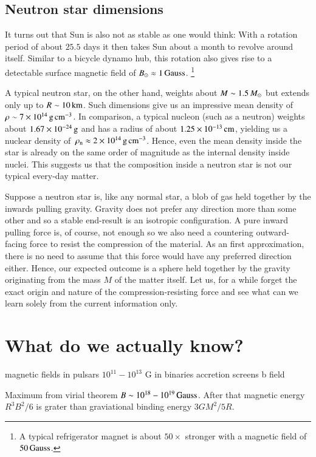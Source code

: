 \subsection{Neutron star dimensions}
It turns out that Sun is also not as stable as one would think:
With a rotation period of about $25.5$ days it then takes Sun about a month to revolve around itself.
Similar to a bicycle dynamo hub, this rotation also gives rise to a detectable surface magnetic field of $B_{\odot} \approx 1 \, \mathrm{Gauss}$.%
\footnote{A typical refrigerator magnet is about $50\times$ stronger with a magnetic field of $50\, \mathrm{Gauss}$.}

A typical neutron star, on the other hand, weights about $M \sim 1.5\, M_{\odot}$ but extends only up to $R \sim 10\, \mathrm{km}$.
Such dimensions give us an impressive mean density of $\rho \sim 7 \times 10^{14} \, \mathrm{g}\,\mathrm{cm}^{-3} $.
In comparison, a typical nucleon (such as a neutron) weights about $1.67 \times 10^{-24} \, \mathrm{g}$ and has a radius of about $1.25 \times 10^{-13} \, \mathrm{cm}$, yielding us a nuclear density of $\, \rho_{\mathrm{n}}  \approx 2 \times 10^{14} \, \mathrm{g}\,\mathrm{cm}^{-3} $.
Hence, even the mean density inside the star is already on the same order of magnitude as the internal density inside nuclei.
This suggests us that the composition inside a neutron star is not our typical every-day matter.


Suppose a neutron star is, like any normal star, a blob of gas held together by the inwards pulling gravity.
Gravity does not prefer any direction more than some other and so a stable end-result is an isotropic configuration.
A pure inward pulling force is, of course, not enough so we also need a countering outward-facing force to resist the compression of the material.
As an first approximation, there is no need to assume that this force would have any preferred direction either.
Hence, our expected outcome is a sphere held together by the gravity originating from the mass $M$ of the matter itself.
Let us, for a while forget the exact origin and nature of the compression-resisting force and see what can we learn solely from the current information only.

\section{What do we actually know?}


magnetic fields in pulsars $10^{11} - 10^{13}$ G \cite{MHT05}
in binaries accretion screens b field \cite{CZB01}

Maximum from virial theorem $B \sim 10^{18} - 10^{19}\, \mathrm{Gauss}$.
After that magnetic energy $R^3 B^2 / 6$ is grater than graviational binding energy $3 G M^2 / 5 R$.\cite{CF53,ST83,LS91}


